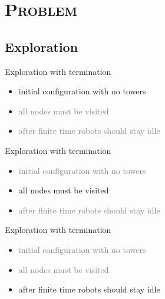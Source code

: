 \documentclass[xcolor=x11names,compress]{beamer}
\renewcommand{\(}{\begin{columns}}
\renewcommand{\)}{\end{columns}}
\newcommand{\<}[1]{\begin{column}{#1}}
\renewcommand{\>}{\end{column}}
\begin{document}
\section{\scshape Problem}
\subsection{Exploration}
\begin{frame}{Exploration with termination}
\begin{itemize}
 \item initial configuration with no towers
 \item \textcolor{gray}{all nodes must be visited}
 \item \textcolor{gray}{after finite time robots should stay idle}
\end{itemize}
\end{frame}

\begin{frame}{Exploration with termination}
\begin{itemize}
 \item \textcolor{gray}{initial configuration with no towers}
 \item all nodes must be visited
 \item \textcolor{gray}{after finite time robots should stay idle}
\end{itemize}
\end{frame}

\begin{frame}{Exploration with termination}
\begin{itemize}
 \item \textcolor{gray}{initial configuration with no towers}
 \item \textcolor{gray}{all nodes must be visited}
 \item after finite time robots should stay idle
\end{itemize}
\end{frame}
\end{document}
